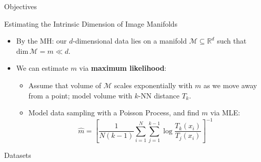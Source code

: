 \documentclass[final,hyperref={pdfpagelabels=false}]{beamer}
\begin{document}
\begin{frame}[t]
\begin{columns}[t]
\begin{column}{.3\textwidth}
\begin{block}{Objectives}
\end{block}

\begin{block}{Estimating the Intrinsic Dimension of Image Manifolds}
\begin{itemize}
    \item By the MH: our $d$-dimensional data lies on a manifold $\mathcal{M}\subseteq \mathbb{R}^d$ such that $\mathrm{dim}\,{\mathcal{M}}=m\ll d$.
\item We can estimate $m$ via \textbf{maximum likelihood}:
    \begin{itemize}
        \item Assume that volume of $\mathcal{M}$ scales exponentially with $m$ as we move away from a point; model volume with $k$-NN distance $T_k$.
        \item Model data sampling with a Poisson Process, and find $m$ via MLE:
        \begin{equation*}
            \label{eq:id_mle}
                \hat{m}=\left[\frac{1}{N(k-1)} \sum_{i=1}^{N} \sum_{j=1}^{k-1} \log \frac{T_{k}\left(x_{i}\right)}{T_{j}\left(x_{i}\right)}\right]^{-1}
        \end{equation*}
    \end{itemize}

\end{itemize}
\end{block}

\begin{block}{Datasets}


\end{block}
\end{column}
\end{columns}
\end{frame}
\end{document}

